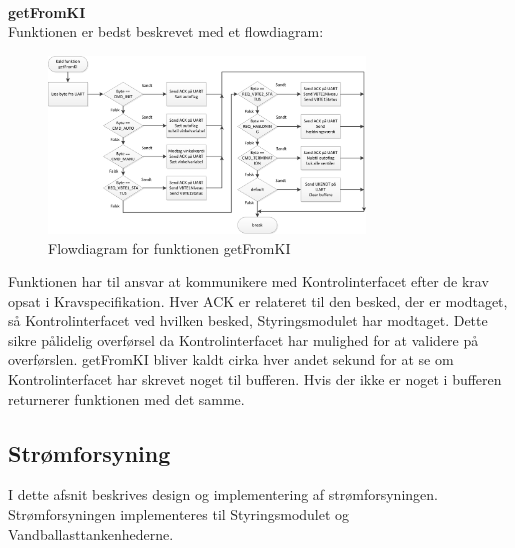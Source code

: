 \\\\\\
\textbf{getFromKI}\\
Funktionen er bedst beskrevet med et flowdiagram:
\begin{figure}[H]
	\centering
	\includegraphics[width=0.75\textwidth]{billeder/getFromKIflowchart}
	\caption{Flowdiagram for funktionen getFromKI}
	\label{fig:gFKIfc}
\end{figure}
Funktionen har til ansvar at kommunikere med Kontrolinterfacet efter de krav opsat i Kravspecifikation. Hver ACK er relateret til den besked, der er modtaget, så Kontrolinterfacet ved hvilken besked, Styringsmodulet har modtaget. Dette sikre pålidelig overførsel da Kontrolinterfacet har mulighed for at validere på overførslen. getFromKI bliver kaldt cirka hver andet sekund for at se om Kontrolinterfacet har skrevet noget til bufferen. Hvis der ikke er noget i bufferen returnerer funktionen med det samme.\\

\subsection{Strømforsyning}
I dette afsnit beskrives design og implementering af strømforsyningen. Strømforsyningen implementeres til Styringsmodulet og Vandballasttankenhederne.
